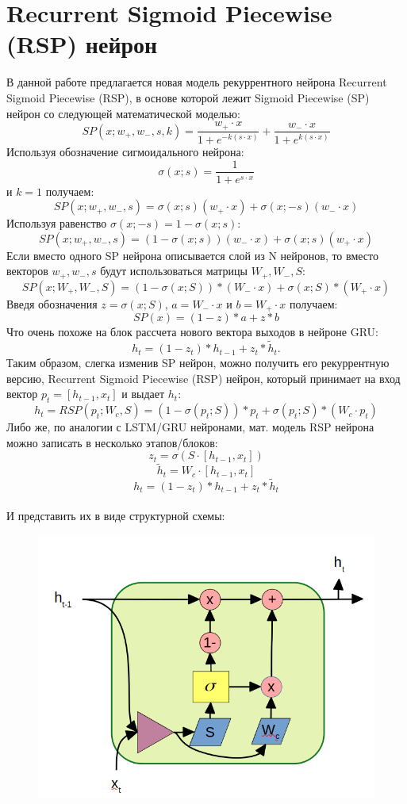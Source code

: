 \documentclass[11pt]{article}
\begin{document}
\section*{Recurrent Sigmoid Piecewise (RSP) нейрон}
В данной работе предлагается новая модель рекуррентного нейрона Recurrent Sigmoid Piecewise (RSP), в основе которой лежит Sigmoid Piecewise (SP) нейрон со следующей математической моделью:
$$ SP(x;w_+,w_-,s,k)=\frac{w_+ \cdot x}{1 + e^{-k(s \cdot x)}} + \frac{w_- \cdot x}{1 + e^{k(s \cdot x)}} $$
Используя обозначение сигмоидального нейрона:
$$\sigma(x;s)=\frac{1}{1+e^{s \cdot x}}$$
и $k=1$ получаем:
$$ SP(x;w_+,w_-,s)=\sigma(x;s)(w_+ \cdot x) + \sigma(x;-s)(w_- \cdot x) $$
Используя равенство $\sigma(x;-s)=1 - \sigma(x;s)$:
$$ SP(x;w_+,w_-,s) = (1 - \sigma(x;s))(w_- \cdot x) + \sigma(x;s)(w_+ \cdot x) $$
Если вместо одного SP нейрона описывается слой из N нейронов, то вместо векторов $w_+,w_-,s$ будут использоваться матрицы $W_+,W_-,S$:
$$ SP(x;W_+,W_-, S) = (1 - \sigma(x;S)) * (W_- \cdot x) + \sigma(x;S) * (W_+ \cdot x) $$
Введя обозначения $ z = \sigma(x;S) $, $a = W_- \cdot x$ и $b = W_+ \cdot x$ получаем:
$$ SP(x) = (1 - z) * a + z * b $$
Что очень похоже на блок рассчета нового вектора выходов в нейроне GRU:
$$ h_t = (1-z_t)*h_{t-1} + z_t*\tilde{h}_t. $$
Таким образом, слегка изменив SP нейрон, можно получить его рекуррентную версию, Recurrent Sigmoid Piecewise (RSP) нейрон, который принимает на вход вектор $p_t=[h_{t-1}, x_t]$ и выдает $h_t$:
$$ h_t=RSP(p_t;W_c,S) = (1-\sigma(p_t;S))*p_t + \sigma(p_t;S)*(W_c \cdot p_t) $$
Либо же, по аналогии с LSTM/GRU нейронами, мат. модель RSP нейрона можно записать в несколько этапов/блоков:
$$ z_t = \sigma(S \cdot [h_{t-1}, x_t]) $$
$$ \tilde{h}_t = W_c \cdot [h_{t-1}, x_t] $$
$$ h_t = (1 - z_t) * h_{t-1} + z_t * \tilde{h}_t $$
\\
И представить их в виде структурной схемы:
\\
\begin{figure}[H]
\centering
\includegraphics[scale=0.3]{recurrent_sigmoid_piecewise_neuron_structure.png}
\label{}
\end{figure}
\end{document}
